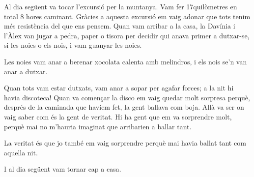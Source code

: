 \begin{news}
Al dia següent va tocar l'excursió per la muntanya. Vam fer 17quilòmetres en total 8 hores caminant. Gràcies a aquesta excursió em vaig adonar que tots tenim més resistència del que ens pensem. Quan vam arribar a la casa, la Davínia i l'Àlex van jugar a pedra, paper o tisora per decidir qui anava primer a dutxar-se, si les noies o els nois, i vam guanyar les noies. 

Les noies vam anar a berenar xocolata calenta amb melindros, i els nois se'n van anar a dutxar. 

Quan tots vam estar dutxats, vam anar a sopar per agafar forces; a la nit hi havia discoteca! Quan va començar la disco em vaig quedar molt sorpresa perquè, després de la caminada que havíem fet,  la gent ballava com boja. Allà va ser on vaig saber com és la gent de veritat. Hi ha gent que em va sorprendre molt, perquè mai no m'hauria imaginat que arribarien a ballar tant. 

La veritat és que jo també em vaig sorprendre  perquè mai havia ballat tant com aquella nit. 

I al dia següent vam tornar cap a casa.


\end{news}

\newssep
